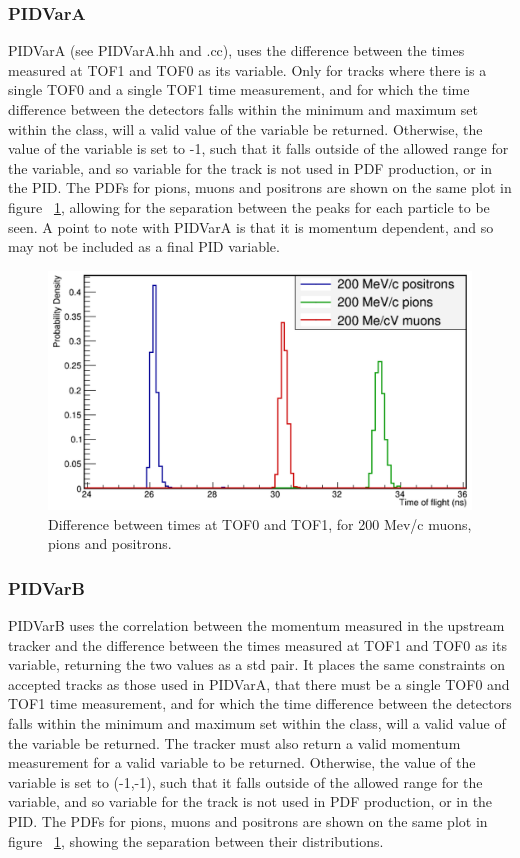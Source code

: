 \subsubsection{PIDVarA}
\label{PIDVarA}
PIDVarA (see PIDVarA.hh and .cc), uses the difference between the times measured at TOF1 
and TOF0 as its variable. Only for tracks where there is a single TOF0 
and a single TOF1 time measurement, and for which the time difference 
between the detectors falls within the minimum and maximum set within 
the class, will a valid value of the variable be returned. Otherwise, 
the value of the variable is set to -1, such that it falls outside of 
the allowed range for the variable, and so variable for the track is 
not used in PDF production, or in the PID. The PDFs for pions, muons and positrons are 
shown on the same plot in figure ~\ref{tofplot}, allowing for the separation between the peaks 
for each particle to be seen. A point to note with PIDVarA is that it is momentum dependent, and 
so may not be included as a final PID variable.

\begin{figure}[h!]
\begin{center} 
\includegraphics[width=4.5in]{reconstruction/globalpid/tofplot.jpg} 
\caption{Difference between times at TOF0 and TOF1, for 200 Mev/c muons, pions and positrons.}
\label{tofplot}
\end{center} 
\end{figure}

\subsubsection{PIDVarB}
\label{PIDVarB}
PIDVarB uses the correlation between the momentum measured in the upstream tracker 
and the difference between the times measured at TOF1 and TOF0 as its variable, returning the two 
values as a std pair. It places the same constraints on accepted tracks as those used in PIDVarA, that 
there must be a single TOF0 and TOF1 time measurement, and for which the time difference 
between the detectors falls within the minimum and maximum set within 
the class, will a valid value of the variable be returned. The tracker must also return a 
valid momentum measurement for a valid variable to be returned. Otherwise, 
the value of the variable is set to (-1,-1), such that it falls outside of 
the allowed range for the variable, and so variable for the track is 
not used in PDF production, or in the PID. The PDFs for pions, muons and positrons are 
shown on the same plot in figure ~\ref{tofplot}, showing the separation between their distributions.

